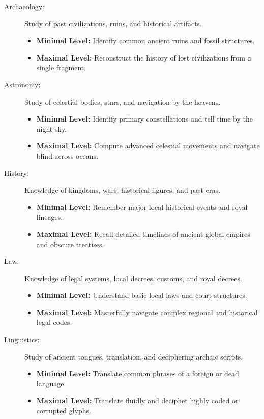 \begin{description}
    \item[Archaeology:] Study of past civilizations, ruins, and historical artifacts.
        \begin{itemize}
            \item \textbf{Minimal Level:} Identify common ancient ruins and fossil structures.
            \item \textbf{Maximal Level:} Reconstruct the history of lost civilizations from a single fragment.
        \end{itemize}

    \item[Astronomy:] Study of celestial bodies, stars, and navigation by the heavens.
        \begin{itemize}
            \item \textbf{Minimal Level:} Identify primary constellations and tell time by the night sky.
            \item \textbf{Maximal Level:} Compute advanced celestial movements and navigate blind across oceans.
        \end{itemize}

    \item[History:] Knowledge of kingdoms, wars, historical figures, and past eras.
        \begin{itemize}
            \item \textbf{Minimal Level:} Remember major local historical events and royal lineages.
            \item \textbf{Maximal Level:} Recall detailed timelines of ancient global empires and obscure treatises.
        \end{itemize}

    \item[Law:] Knowledge of legal systems, local decrees, customs, and royal decrees.
        \begin{itemize}
            \item \textbf{Minimal Level:} Understand basic local laws and court structures.
            \item \textbf{Maximal Level:} Masterfully navigate complex regional and historical legal codes.
        \end{itemize}

    \item[Linguistics:] Study of ancient tongues, translation, and deciphering archaic scripts.
        \begin{itemize}
            \item \textbf{Minimal Level:} Translate common phrases of a foreign or dead language.
            \item \textbf{Maximal Level:} Translate fluidly and decipher highly coded or corrupted glyphs.
        \end{itemize}


\end{description}
